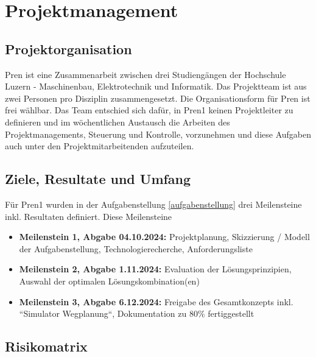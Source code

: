 \documentclass[../main.tex]{subfiles}
\begin{document}
\newpage
\section{Projektmanagement}

\subsection {Projektorganisation}
Pren ist eine Zusammenarbeit zwischen drei Studiengängen der Hochschule Luzern - Maschinenbau, Elektrotechnik und Informatik. Das Projektteam ist aus zwei Personen pro Disziplin zusammengesetzt. Die Organisationsform für Pren ist frei wählbar. Das Team entschied sich dafür, in Pren1 keinen Projektleiter zu definieren und im wöchentlichen Austausch die Arbeiten des Projektmanagements, Steuerung und Kontrolle, vorzunehmen und diese Aufgaben auch unter den Projektmitarbeitenden aufzuteilen.

\subsection{Ziele, Resultate und Umfang}
Für Pren1 wurden in der Aufgabenstellung \ref{aufgabenstellung} drei Meilensteine inkl. Resultaten definiert. Diese Meilensteine 
\begin{itemize}
    \item \textbf{Meilenstein 1, Abgabe 04.10.2024: }Projektplanung, Skizzierung / Modell der Aufgabenstellung, Technologierecherche, Anforderungsliste
    \item \textbf{Meilenstein 2, Abgabe 1.11.2024: } Evaluation der Lösungsprinzipien, Auswahl der optimalen Lösungskombination(en)
    \item \textbf{Meilenstein 3, Abgabe 6.12.2024: } Freigabe des Gesamtkonzepts inkl. ``Simulator Wegplanung``, Dokumentation zu 80\% fertiggestellt
\end{itemize}

\subsection{Risikomatrix} \label{risikomatrix}
\end{document}
